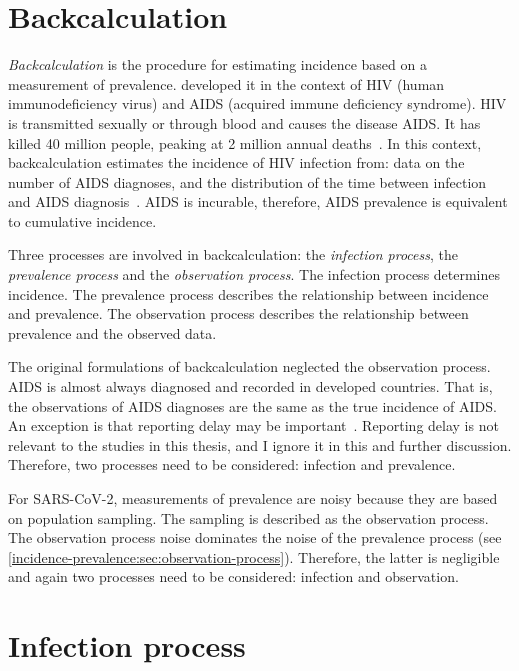 \documentclass[thesis.tex]{subfiles}
\begin{document}
\section{Backcalculation}

\emph{Backcalculation} is the procedure for estimating incidence based on a measurement of prevalence.
\Textcite{brookmeyerMethod} developed it in the context of HIV (human immunodeficiency virus) and AIDS (acquired immune deficiency syndrome).
HIV is transmitted sexually or through blood and causes the disease AIDS.
It has killed 40 million people, peaking at 2 million annual deaths~\autocite{unaids2023}.
In this context, backcalculation estimates the incidence of HIV infection from: data on the number of AIDS diagnoses, and the distribution of the time between infection and AIDS diagnosis~\autocites{brookmeyerBackcalculation}{brookmeyerMeasuring}.
AIDS is incurable, therefore, AIDS prevalence is equivalent to cumulative incidence.

Three processes are involved in backcalculation: the \emph{infection process}, the \emph{prevalence process} and the \emph{observation process}.
The infection process determines incidence.
The prevalence process describes the relationship between incidence and prevalence.
The observation process describes the relationship between prevalence and the observed data.

The original formulations of backcalculation neglected the observation process.
AIDS is almost always diagnosed and recorded in developed countries.
That is, the observations of AIDS diagnoses are the same as the true incidence of AIDS.
An exception is that reporting delay may be important~\autocite{paganoHIV}.
Reporting delay is not relevant to the studies in this thesis, and I ignore it in this and further discussion.
Therefore, two processes need to be considered: infection and prevalence.

For SARS-CoV-2, measurements of prevalence are noisy because they are based on population sampling.
The sampling is described as the observation process.
The observation process noise dominates the noise of the prevalence process (see \cref{incidence-prevalence:sec:observation-process}).
Therefore, the latter is negligible and again two processes need to be considered: infection and observation.

\section{Infection process}
\end{document}
